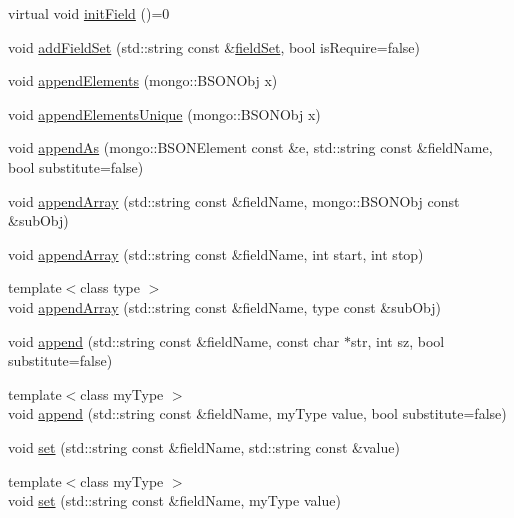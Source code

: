 \begin{DoxyCompactItemize}
\item 
virtual void \hyperlink{classunisys_1_1DataObj_acdc1989300995834a6c8ff03dc2f1268}{init\-Field} ()=0
\item 
void \hyperlink{classunisys_1_1DataObj_a9a6de9a55343929343fcbba6ac0cbd7f}{add\-Field\-Set} (std\-::string const \&\hyperlink{classunisys_1_1DataObj_a821fe7b1d5c081703b92bba388f8de6f}{field\-Set}, bool is\-Require=false)
\item 
void \hyperlink{classunisys_1_1DataObj_aeae53e9f475d1d5baeacfb17f76d4daf}{append\-Elements} (mongo\-::\-B\-S\-O\-N\-Obj x)
\item 
void \hyperlink{classunisys_1_1DataObj_a6ea78a908761eedba5f944d644c951b3}{append\-Elements\-Unique} (mongo\-::\-B\-S\-O\-N\-Obj x)
\item 
void \hyperlink{classunisys_1_1DataObj_ab1170cf2eb665d6caa1da03ee3cb16bd}{append\-As} (mongo\-::\-B\-S\-O\-N\-Element const \&e, std\-::string const \&field\-Name, bool substitute=false)
\item 
void \hyperlink{classunisys_1_1DataObj_a674e261874099b4a1d1a8ec3204010da}{append\-Array} (std\-::string const \&field\-Name, mongo\-::\-B\-S\-O\-N\-Obj const \&sub\-Obj)
\item 
void \hyperlink{classunisys_1_1DataObj_a7f66c4be5b17528ebab7025c5ad05895}{append\-Array} (std\-::string const \&field\-Name, int start, int stop)
\item 
{\footnotesize template$<$class type $>$ }\\void \hyperlink{classunisys_1_1DataObj_ab14bb36e1a267ea1cfc70eef456995e6}{append\-Array} (std\-::string const \&field\-Name, type const \&sub\-Obj)
\item 
void \hyperlink{classunisys_1_1DataObj_a26834076eef0ce5f207c9b8378fabe3b}{append} (std\-::string const \&field\-Name, const char $\ast$str, int sz, bool substitute=false)
\item 
{\footnotesize template$<$class my\-Type $>$ }\\void \hyperlink{classunisys_1_1DataObj_a2e03be1975e5773b3cecb2dfff81c041}{append} (std\-::string const \&field\-Name, my\-Type value, bool substitute=false)
\item 
void \hyperlink{classunisys_1_1DataObj_ab3952fdef2b7b3311d697e0308da79e0}{set} (std\-::string const \&field\-Name, std\-::string const \&value)
\item 
{\footnotesize template$<$class my\-Type $>$ }\\void \hyperlink{classunisys_1_1DataObj_ab41848078c60f0b343f5edc979d12039}{set} (std\-::string const \&field\-Name, my\-Type value)

\end{DoxyCompactItemize}
